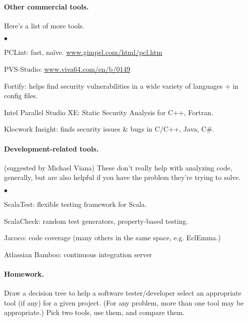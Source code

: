 \documentclass[11pt]{article}
\newcommand{\squishlist}{
 \begin{list}{$\bullet$}
  { \setlength{\itemsep}{0pt}
     \setlength{\parsep}{3pt}
     \setlength{\topsep}{3pt}
     \setlength{\partopsep}{0pt}
     \setlength{\leftmargin}{1.5em}
     \setlength{\labelwidth}{1em}
     \setlength{\labelsep}{0.5em} } }
\newcommand{\squishend}{
  \end{list}  }
\begin{document}
\paragraph{Other commercial tools.} Here's a list of more tools.
\squishlist
\item    PCLint: fast, na\"ive. \url{www.gimpel.com/html/pcl.htm}
\item PVS-Studio: \url{www.viva64.com/en/b/0149}
\item Fortify: helps find security vulnerabilities in a wide variety of languages + in config files.
\item Intel Parallel Studio XE: Static Security Analysis for C++, Fortran.
\item Klocwork Insight: finds security issues \& bugs in C/C++, Java, C\#.
\squishend

\paragraph{Development-related tools.} (suggested by Michael Viana) These don't really help with analyzing code, generally, but are also helpful if you have the problem they're trying to solve.
\squishlist
\item    ScalaTest: flexible testing framework for Scala.
\item    ScalaCheck: random test generators, property-based testing.
\item    Jacoco: code coverage (many others in the same space, e.g. EclEmma.)
\item    Atlassian Bamboo: continuous integration server
\squishend

\paragraph{Homework.}
Draw a decision tree to help a software tester/developer select an appropriate tool (if any) for a given project. (For any problem, more than one tool may be appropriate.)
Pick two tools, use them, and compare them.
    
\end{document}
